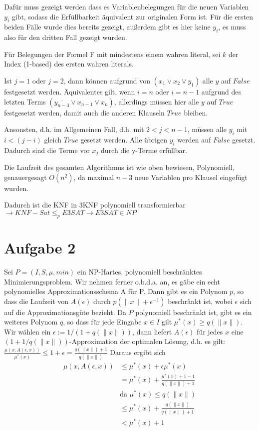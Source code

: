 \documentclass[a4paper,10pt,oneside,reqno]{scrartcl}
\begin{document}
Dafür muss gezeigt werden dass es Variablenbelegungen für die neuen Variablen $y_i$ gibt, sodass die Erfüllbarkeit äquivalent zur originalen Form ist. Für die ersten beiden Fälle wurde dies bereits gezeigt, außerdem gibt es hier keine $y_i$, es muss also für den dritten Fall gezeigt wurden.

Für Belegungen der Formel F mit mindestens einem wahren literal, sei $k$ der Index (1-based) des ersten wahren literals.

Ist $j=1$ oder $j=2$, dann können aufgrund von $(x_1 \vee x_2 \vee y_1)$ alle $y$ auf $False$ festgesetzt werden.
Äquivalentes gilt, wenn $i=n$ oder $i=n-1$ aufgrund des letzten Terms $(\overline{y_{n-3}} \vee x_{n-1} \vee x_{n})$, allerdings müssen hier alle $y$ auf $True$ festgesetzt werden, damit auch die anderen Klauseln $True$ bleiben.

Ansonsten, d.h. im Allgemeinen Fall, d.h. mit $2 < j < n-1$, müssen alle $y_i$ mit $i < (j-i)$ gleich $True$ gesetzt werden. Alle übrigen $y_i$ werden auf $False$ gesetzt. Dadurch sind die Terme vor $x_j$ durch die y-Terme erfüllbar.

Die Laufzeit des gesamten Algorithmus ist wie oben bewiesen, Polynomiell, genauergesagt $O(n^2)$, da maximal $n-3$ neue Variablen pro Klausel eingefügt wurden.

Dadurch ist die KNF in 3KNF polynomiell transformierbar $\rightarrow KNF-Sat \leq_p E3SAT \rightarrow E3SAT \in NP$

\section*{Aufgabe 2}%
Sei $P = (I, S, \mu, min)$ ein $\mathrm{NP}$-Hartes, polynomiell beschränktes Minimierungsproblem. Wir nehmen ferner o.b.d.a. an, es gäbe ein echt polynomielles Approximationsschema A für P. Dann gibt es ein Polynom $p$, so dass die Laufzeit von $A(\epsilon)$ durch $p(\lVert x \rVert + \epsilon^{-1})$ beschränkt ist, wobei $\epsilon$ sich auf die Approximationsgüte bezieht. Da $P$ polynomiell beschränkt ist, gibt es ein weiteres Polynom $q$, so dass für jede Eingabe $x\in I$ gilt $\mu^*(x) \geq q(\lVert x \rVert)$. Wir wählen ein $\epsilon := 1/(1+q(\lVert x\rVert))$, dann liefert $A(\epsilon)$ für jedes $x$ eine $(1 + 1/q(\lVert x\rVert))$-Approximation der optimalen
Lösung, d.h. es gilt:
$\frac{\mu(x,A(\epsilon,x))}{\mu^*(x)} \leq 1 + \epsilon = \frac{q(\lVert x\rVert) + 1}{q(\lVert x\rVert)}$
Daraus ergibt sich \begin{align}
              \mu(x,A(\epsilon,x)) &\leq \mu^*(x) + \epsilon\mu^*(x) \\
              & = \mu^*(x) + \frac{\mu^*(x) + 1 - 1}{q(\lVert x\rVert) + 1} \\
              & \text{da } \mu^*(x) \leq q(\lVert x\rVert) \\
              & \leq \mu^*(x) + \frac{q(\lVert x\rVert)}{q(\lVert x\rVert) + 1} \\
              & < \mu^*(x) + 1
             \end{align}
\end{document}
